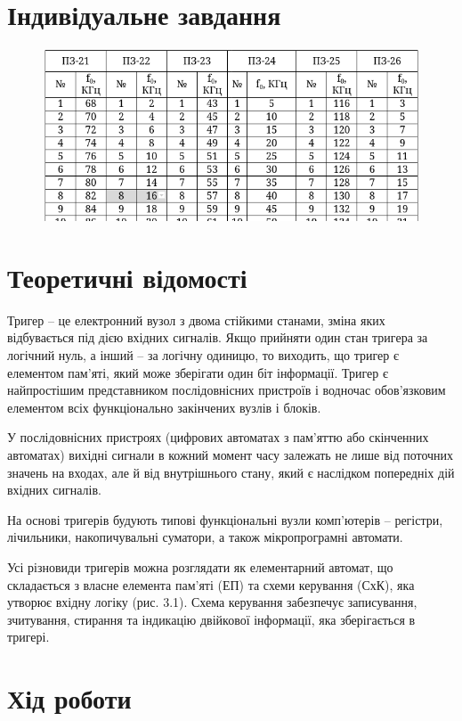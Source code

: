 \documentclass{article}
\begin{document}
\begin{normalsize}
	\section*{Індивідуальне завдання}
\begin{figure}[H]
		\centering
		\includegraphics[scale=0.75]{v}
	\end{figure}	

	\section*{Теоретичні відомості}
	Тригер – це електронний вузол з двома стійкими станами, зміна яких відбувається під дією вхідних сигналів. Якщо прийняти один стан тригера за логічний нуль, а інший – за логічну одиницю, то виходить, що тригер є елементом пам’яті, який може зберігати один біт інформації. Тригер є найпростішим представником послідовнісних пристроїв і водночас обов’язковим елементом всіх функціонально закінчених вузлів і блоків.
	
	У послідовнісних пристроях (цифрових автоматах з пам’яттю або скінченних автоматах) вихідні сигнали в кожний момент часу залежать не лише від поточних значень на входах, але й від внутрішнього стану, який є наслідком попередніх дій вхідних сигналів. 
	
	На основі тригерів будують типові функціональні вузли комп’ютерів – регістри, лічильники, накопичувальні суматори, а також мікропрограмні автомати.
	
	Усі різновиди тригерів можна розглядати як елементарний автомат, що складається з власне елемента пам’яті (ЕП) та схеми керування (СхК), яка утворює вхідну логіку (рис. 3.1). Схема керування забезпечує записування, зчитування, стирання та індикацію двійкової інформації, яка зберігається в тригері. 
	
	
	\section*{Хід роботи}
	

\end{normalsize}
\end{document}
